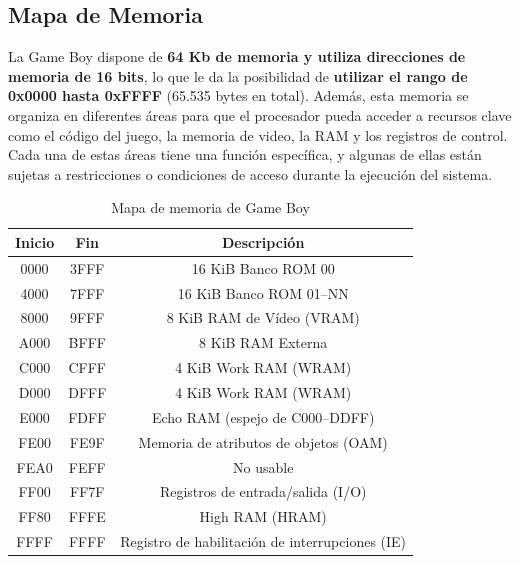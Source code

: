 
\subsection{Mapa de Memoria}

La Game Boy dispone de \textbf{64 Kb de memoria y utiliza direcciones de memoria de 16 bits}, lo que le da la posibilidad de \textbf{utilizar el rango de 0x0000 hasta 0xFFFF} (65.535 bytes en total). Además, esta memoria se organiza en diferentes áreas para que el procesador pueda acceder a recursos clave como el código del juego, la memoria de video, la RAM y los registros de control. Cada una de estas áreas tiene una función específica, y algunas de ellas están sujetas a restricciones o condiciones de acceso durante la ejecución del sistema.

\begin{table}[h]
\centering
\begin{tabular}{|c|c|c|}
\hline
\textbf{Inicio} & \textbf{Fin} & \textbf{Descripción} \\ \hline
0000 & 3FFF & 16 KiB Banco ROM 00 \\ \hline
4000 & 7FFF & 16 KiB Banco ROM 01–NN \\ \hline
8000 & 9FFF & 8 KiB RAM de Vídeo (VRAM) \\ \hline
A000 & BFFF & 8 KiB RAM Externa \\ \hline
C000 & CFFF & 4 KiB Work RAM (WRAM) \\ \hline
D000 & DFFF & 4 KiB Work RAM (WRAM) \\ \hline
E000 & FDFF & Echo RAM (espejo de C000–DDFF) \\ \hline
FE00 & FE9F & Memoria de atributos de objetos (OAM) \\ \hline
FEA0 & FEFF & No usable \\ \hline
FF00 & FF7F & Registros de entrada/salida (I/O) \\ \hline
FF80 & FFFE & High RAM (HRAM) \\ \hline
FFFF & FFFF & Registro de habilitación de interrupciones (IE) \\ \hline
\end{tabular}
\caption{Mapa de memoria de Game Boy}
\end{table}

